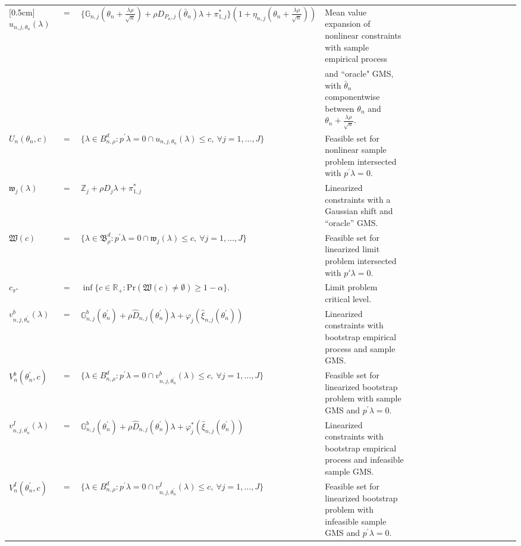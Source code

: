 \documentclass[letterpaper,11pt]{article}
\theoremstyle{myplain}
\theoremstyle{mydefinition}
\theoremstyle{myremark}
\newcommand{\HH}{\mathbb{Z}}
\newcommand{\larhon}{\frac{\lambda \rho }{\sqrt n}}
\numberwithin{equation}{section}
\numberwithin{figure}{section}
\begin{document}
\begin{appendices}
\begin{table}[htbp]
{\begin{tabular}{lllllllllllllllll}
[0.5cm]
$u_{n,j,\theta_n}(\lambda)$ & $=$ &  $\{\mathbb G_{n,j}(\theta_n+\larhon)+\rho D_{P_n,j}(\bar{\theta}_n)\lambda+\pi^*_{1,j}\}(1+\eta_{n,j}(\theta_n+\larhon))$ & Mean value expansion of nonlinear constraints with sample empirical process \\
 &  &  & and ``oracle" GMS, with $\bar{\theta}_n$ componentwise between $\theta_n$ and $\theta_n+\larhon$.\\
[0.4cm]
$U_n(\theta_n,c)$ & $=$ &  $\big\{\lambda\in B^d_{n,\rho}: p^\prime \lambda = 0 \cap u_{n,j,\theta_n}(\lambda)\le c, \: \forall j=1,\dots,J\big\}$ & Feasible set for nonlinear sample problem intersected with $p^\prime \lambda=0$.\\
[0.4cm]
$\mathfrak{w}_{j}(\lambda)$ & $=$ & $\HH_{j}+\rho D_{j}\lambda+\pi^*_{1,j}$ & Linearized constraints with a Gaussian shift and ``oracle'' GMS.   \\
[0.4cm]
$\mathfrak W(c)$ & $=$ & $\big\{\lambda\in \mathfrak B^d_\rho: p^\prime \lambda = 0 \cap \mathfrak w_{j}(\lambda)\le c, \: \forall j=1,\dots,J\big\}$ & Feasible set for linearized limit problem intersected with $p'\lambda=0$.
\\
[0.4cm]
$c_{\pi^*}$ &$=$ & $\inf\{c\in\mathbb R_+:\mathrm{Pr}(\mathfrak{W}(c)\ne\emptyset)\ge 1-\alpha\}$.& Limit problem critical level.
\\
[0.4cm]
$v^b_{n,j,\theta_n^\prime}(\lambda)$ & $=$ &  $\mathbb G^b_{n,j}(\theta_n^\prime)+\rho \hat{D}_{n,j}(\theta_n^\prime)\lambda+\varphi_j(\hat{\xi}_{n,j}(\theta_n^\prime))$ & Linearized constraints with bootstrap empirical process and sample GMS.\\
[0.4cm]
$V_n^b(\theta_n^\prime,c)$ & $=$ &  $\big\{ \lambda\in B^d_{n,\rho}: p^\prime \lambda = 0 \cap v^b_{n,j,\theta_n^\prime}(\lambda)\le c, \: \forall j=1,\dots,J\big\}$ & Feasible set for linearized bootstrap problem with sample GMS and $p^\prime \lambda=0$. &\\
[0.4cm]
$v^I_{n,j,\theta_n^\prime}(\lambda)$ & $=$ &  $\mathbb G^b_{n,j}(\theta_n^\prime)+\rho \hat{D}_{n,j}(\theta_n^\prime)\lambda+\varphi^*_j(\hat{\xi}_{n,j}(\theta_n^\prime))$ & Linearized constraints with bootstrap empirical process and infeasible sample GMS.\\
[0.4cm]
$V_n^I(\theta_n^\prime,c)$ & $=$ &  $\big\{ \lambda\in B^d_{n,\rho}: p^\prime \lambda = 0 \cap v^I_{n,j,\theta_n^\prime}(\lambda)\le c, \: \forall j=1,\dots,J\big\}$ & Feasible set for linearized bootstrap problem with infeasible sample GMS and $p^\prime \lambda=0$. &\\
[0.4cm]











\end{tabular}}
\end{table}
\end{appendices}
\end{document}
